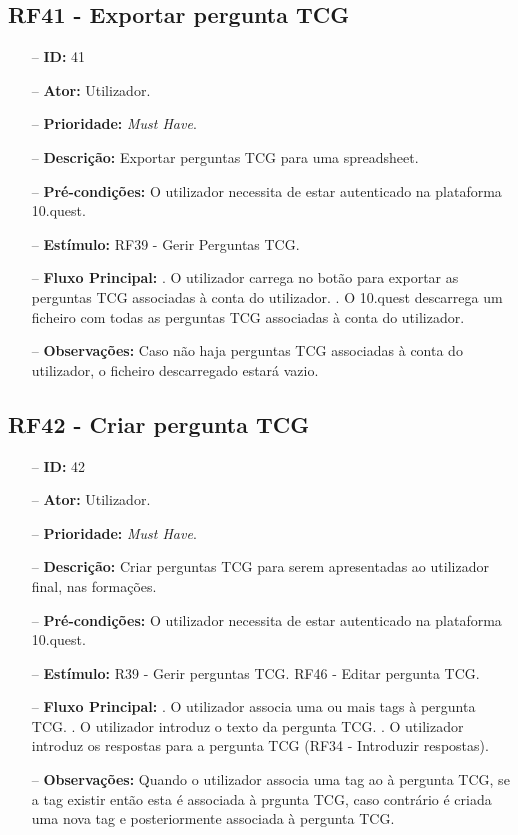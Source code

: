 \subsection{RF41 - Exportar pergunta TCG}
\begin{itemize}
	\item[--] \textbf{ID:} 41
	\item[--]  \textbf{Ator:} Utilizador.
	\item[--]  \textbf{Prioridade:} \textit{Must Have}.
	\item[--]  \textbf{Descrição:} Exportar perguntas TCG para uma spreadsheet.
	\item[--]  \textbf{Pré-condições:} O utilizador necessita de estar autenticado na plataforma 10.quest.
	\item[--]  \textbf{Estímulo:} RF39 - Gerir Perguntas TCG.
	\item[--]  \textbf{Fluxo Principal:} 
	. O utilizador carrega no botão para exportar as perguntas TCG associadas à conta do utilizador.
	. O 10.quest descarrega um ficheiro com todas as perguntas TCG associadas à conta do utilizador.
	\item[--]  \textbf{Observações:} Caso não haja perguntas TCG associadas à conta do utilizador, o ficheiro descarregado estará vazio.
\end{itemize}
\newpage

\subsection{RF42 - Criar pergunta TCG}
\begin{itemize}
	\item[--] \textbf{ID:} 42
	\item[--]  \textbf{Ator:} Utilizador.
	\item[--]  \textbf{Prioridade:} \textit{Must Have}.
	\item[--]  \textbf{Descrição:} Criar perguntas TCG para serem apresentadas ao utilizador final, nas formações.
	\item[--]  \textbf{Pré-condições:} O utilizador necessita de estar autenticado na plataforma 10.quest.
	\item[--]  \textbf{Estímulo:}  
	\subitem R39 - Gerir perguntas TCG.
	\subitem RF46 - Editar pergunta TCG.
	\item[--]  \textbf{Fluxo Principal:} 
	. O utilizador associa uma ou mais tags à pergunta TCG.
	. O utilizador introduz o texto da pergunta TCG.
	. O utilizador introduz os respostas para a pergunta TCG (RF34 - Introduzir respostas).
	\item[--]  \textbf{Observações:} 
	Quando o utilizador associa uma tag ao à pergunta TCG, se a tag existir então esta é associada à prgunta TCG, caso contrário é criada uma nova tag e posteriormente associada à pergunta TCG.
\end{itemize}
\newpage

